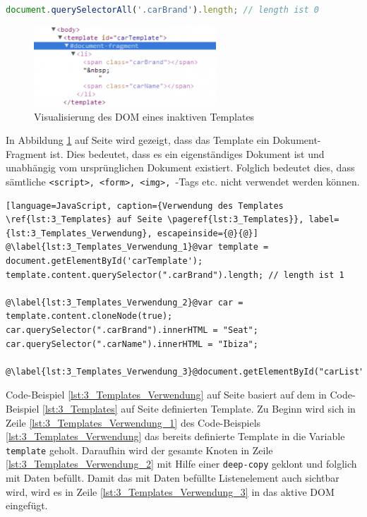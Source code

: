 \begin{lstlisting}[language=JavaScript, caption={Beispiel-Selektor eines Elements in einem Template, das nicht aktiven DOM ist}, label={lst:3_Selector_Example}]
  document.querySelectorAll('.carBrand').length; // length ist 0
\end{lstlisting}

\begin{figure}[h]
\centering
\includegraphics[height=3.0cm]{images/document_fragment.png}
\caption[
Visualisierung des DOM eines inaktiven Templates, Urldate: 04.2014
\newline
\small\texttt{\url{http://www.prevent-default.com/wp-content/uploads/2013/04/document-fragment-300x132.png}}
]{Visualisierung des DOM eines inaktiven Templates}
\label{fig:3_inactive_Template_DOM}
\end{figure}

In Abbildung \ref{fig:3_inactive_Template_DOM} auf Seite \pageref{fig:3_inactive_Template_DOM} wird gezeigt, dass das Template ein Dokument-Fragment ist. Dies bedeutet, dass es ein eigenständiges Dokument ist und unabhängig vom ursprünglichen Dokument existiert. Folglich bedeutet dies, dass sämtliche \lstinline|<script>, <form>, <img>, |-Tags etc. nicht verwendet werden können.

\begin{lstlisting}[language=JavaScript, caption={Verwendung des Templates \ref{lst:3_Templates} auf Seite \pageref{lst:3_Templates}}, label={lst:3_Templates_Verwendung}, escapeinside={@}{@}]
@\label{lst:3_Templates_Verwendung_1}@var template = document.getElementById('carTemplate');
template.content.querySelector(".carBrand").length; // length ist 1

@\label{lst:3_Templates_Verwendung_2}@var car = template.content.cloneNode(true);
car.querySelector(".carBrand").innerHTML = "Seat";
car.querySelector(".carName").innerHTML = "Ibiza";

@\label{lst:3_Templates_Verwendung_3}@document.getElementById("carList").appendChild(car);
\end{lstlisting}

Code-Beispiel \ref{lst:3_Templates_Verwendung} auf Seite \pageref{lst:3_Templates_Verwendung} basiert auf dem in Code-Beispiel \ref{lst:3_Templates} auf Seite \pageref{lst:3_Templates} definierten Template. Zu Beginn wird sich in Zeile \ref{lst:3_Templates_Verwendung_1} des Code-Beispiels \ref{lst:3_Templates_Verwendung} das bereits definierte Template in die Variable \lstinline|template| geholt. Daraufhin wird der gesamte Knoten in Zeile \ref{lst:3_Templates_Verwendung_2} mit Hilfe einer \lstinline|deep-copy| geklont und folglich mit Daten befüllt. Damit das mit Daten befüllte Listenelement auch sichtbar wird, wird es in Zeile \ref{lst:3_Templates_Verwendung_3} in das aktive DOM eingefügt.
